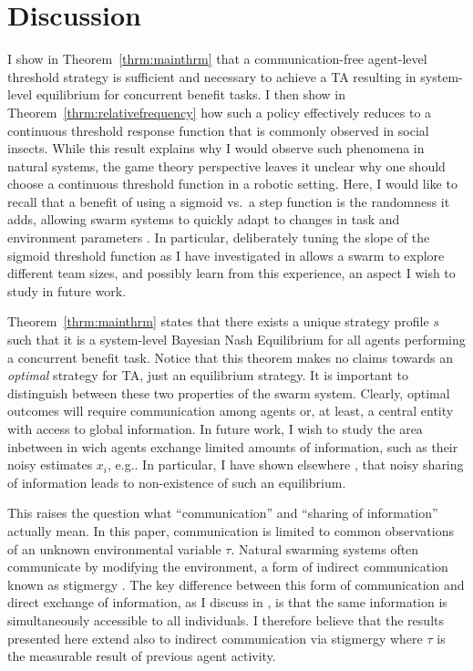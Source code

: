 \documentclass[defaultstyle,12pt]{proposal}
\begin{document}
\section{Discussion}\label{sec:disc}
I show in Theorem~\ref{thrm:mainthrm} that a communication-free agent-level threshold strategy is sufficient and necessary to achieve a TA resulting in system-level equilibrium for concurrent benefit tasks. I then show in Theorem~\ref{thrm:relativefrequency} how such a policy effectively reduces to a continuous threshold response function that is commonly observed in social insects. While this result explains why I would observe such phenomena in natural systems, the game theory perspective leaves it unclear why one should choose a continuous threshold function in a robotic setting. Here, I would like to recall that a benefit of using a sigmoid vs.\ a step function is the randomness it adds, allowing swarm systems to quickly adapt to changes in task and environment parameters \cite{Bonabeau1997}. In particular, deliberately tuning the slope of the sigmoid threshold function as I have investigated in \cite{Kanakia2014} allows a swarm to explore different team sizes, and possibly learn from this experience, an aspect I wish to study in future work. 

Theorem~\ref{thrm:mainthrm} states that there exists a unique strategy profile $s$ such that it is a system-level Bayesian Nash Equilibrium for all agents performing a concurrent benefit task. Notice that this theorem makes no claims towards an \emph{optimal} strategy for TA, just an equilibrium strategy. It is important to distinguish between these two properties of the swarm system. Clearly, optimal outcomes will require communication among agents or, at least, a central entity with access to global information. In future work, I wish to study the area inbetween in wich agents exchange limited amounts of information, such as their noisy estimates $x_i$, e.g.. In particular, I have shown elsewhere \cite{Touri2014}, that noisy sharing of information leads to non-existence of such an equilibrium.

This raises the question what ``communication'' and ``sharing of information'' actually mean. In this paper, communication is limited to common observations of an unknown environmental variable $\tau$. Natural swarming systems often communicate by modifying the environment, a form of indirect communication known as stigmergy \cite{Grasse1959}. The key difference between this form of communication and direct exchange of information, as I discuss in \cite{Touri2014}, is that the same information is simultaneously accessible to all individuals. I therefore believe that the results presented here extend also to indirect communication via stigmergy where $\tau$ is the measurable result of previous agent activity.
\end{document}
